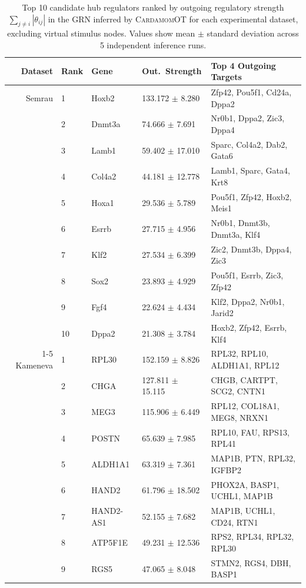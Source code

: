\begin{table}[ht]
\centering
\caption{Top 10 candidate hub regulators ranked by outgoing regulatory strength $\sum_{j\neq i}|\theta_{ij}|$ in the GRN inferred by \textsc{CardamomOT} for each experimental dataset, excluding virtual stimulus nodes. Values show mean $\pm$ standard deviation across 5 independent inference runs.}
\label{tableS3}
\small
\begin{tabularx}{\textwidth}{r l l l X}
\toprule
Dataset & Rank & Gene & Out.\ Strength & Top 4 Outgoing Targets \\
\midrule
Semrau & 1 & Hoxb2 & 133.172 $\pm$ 8.280 & Zfp42, Pou5f1, Cd24a, Dppa2 \\
 & 2 & Dnmt3a & 74.666 $\pm$ 7.691 & Nr0b1, Dppa2, Zic3, Dppa4 \\
 & 3 & Lamb1 & 59.402 $\pm$ 17.010 & Sparc, Col4a2, Dab2, Gata6 \\
 & 4 & Col4a2 & 44.181 $\pm$ 12.778 & Lamb1, Sparc, Gata4, Krt8 \\
 & 5 & Hoxa1 & 29.536 $\pm$ 5.789 & Pou5f1, Zfp42, Hoxb2, Meis1 \\
 & 6 & Esrrb & 27.715 $\pm$ 4.956 & Nr0b1, Dnmt3b, Dnmt3a, Klf4 \\
 & 7 & Klf2 & 27.534 $\pm$ 6.399 & Zic2, Dnmt3b, Dppa4, Zic3 \\
 & 8 & Sox2 & 23.893 $\pm$ 4.929 & Pou5f1, Esrrb, Zic3, Zfp42 \\
 & 9 & Fgf4 & 22.624 $\pm$ 4.434 & Klf2, Dppa2, Nr0b1, Jarid2 \\
 & 10 & Dppa2 & 21.308 $\pm$ 3.784 & Hoxb2, Zfp42, Esrrb, Klf4 \\
\cmidrule{1-5}
Kameneva & 1 & RPL30 & 152.159 $\pm$ 8.826 & RPL32, RPL10, ALDH1A1, RPL12 \\
 & 2 & CHGA & 127.811 $\pm$ 15.115 & CHGB, CARTPT, SCG2, CNTN1 \\
 & 3 & MEG3 & 115.906 $\pm$ 6.449 & RPL12, COL18A1, MEG8, NRXN1 \\
 & 4 & POSTN & 65.639 $\pm$ 7.985 & RPL10, FAU, RPS13, RPL41 \\
 & 5 & ALDH1A1 & 63.319 $\pm$ 7.361 & MAP1B, PTN, RPL32, IGFBP2 \\
 & 6 & HAND2 & 61.796 $\pm$ 18.502 & PHOX2A, BASP1, UCHL1, MAP1B \\
 & 7 & HAND2-AS1 & 52.155 $\pm$ 7.682 & MAP1B, UCHL1, CD24, RTN1 \\
 & 8 & ATP5F1E & 49.231 $\pm$ 12.536 & RPS2, RPL34, RPL32, RPL30 \\
 & 9 & RGS5 & 47.065 $\pm$ 8.048 & STMN2, RGS4, DBH, BASP1 \\

\end{tabularx}
\end{table}
